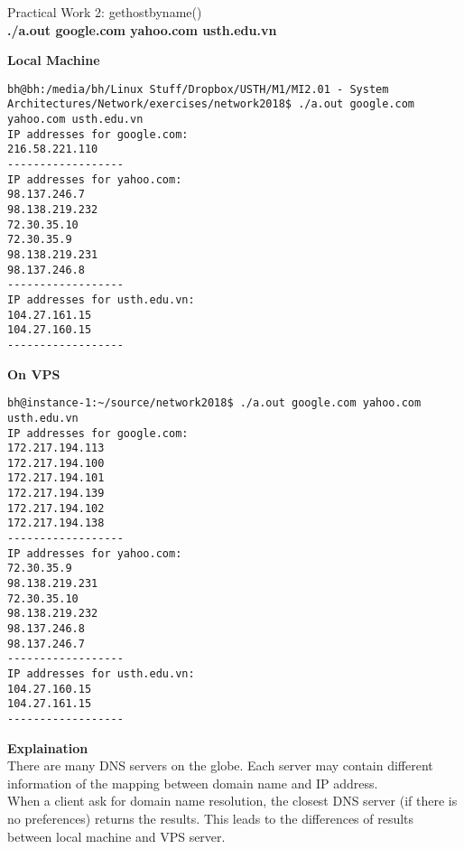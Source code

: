 \documentclass{article}
\begin{document}
Practical Work 2: gethostbyname()\\
\textbf{./a.out google.com yahoo.com usth.edu.vn}

\textbf{Local Machine}
\begin{lstlisting}
bh@bh:/media/bh/Linux Stuff/Dropbox/USTH/M1/MI2.01 - System Architectures/Network/exercises/network2018$ ./a.out google.com yahoo.com usth.edu.vn
IP addresses for google.com: 
216.58.221.110
------------------
IP addresses for yahoo.com: 
98.137.246.7
98.138.219.232
72.30.35.10
72.30.35.9
98.138.219.231
98.137.246.8
------------------
IP addresses for usth.edu.vn: 
104.27.161.15
104.27.160.15
------------------
\end{lstlisting}

\textbf{On VPS}
\begin{lstlisting}
bh@instance-1:~/source/network2018$ ./a.out google.com yahoo.com usth.edu.vn
IP addresses for google.com: 
172.217.194.113
172.217.194.100
172.217.194.101
172.217.194.139
172.217.194.102
172.217.194.138
------------------
IP addresses for yahoo.com: 
72.30.35.9
98.138.219.231
72.30.35.10
98.138.219.232
98.137.246.8
98.137.246.7
------------------
IP addresses for usth.edu.vn: 
104.27.160.15
104.27.161.15
------------------
\end{lstlisting}

\textbf{Explaination}\\
There are many DNS servers on the globe. Each server may contain different information of the mapping between domain name and IP address.\\
When a client ask for domain name resolution, the closest DNS server (if there is no preferences) returns the results. This leads to the differences of results between local machine and VPS server.
\end{document}
